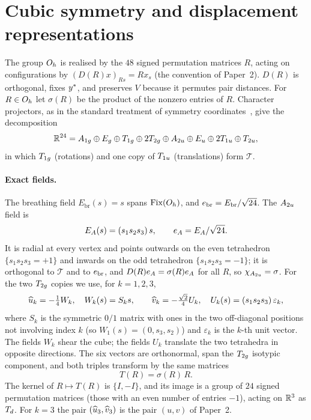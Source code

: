 \section{Cubic symmetry and displacement representations}\label{sec:symmetry}

The group $O_{h}$ is realised by the $48$ signed permutation matrices $R$, acting on configurations by
$(D(R)x)_{Rs}=Rx_s$ (the convention of Paper~2). $D(R)$ is orthogonal, fixes $y^{*}$, and preserves $V$ because it
permutes pair distances. For $R\in O_{h}$ let $\sigma(R)$ be the product of the nonzero entries of $R$. Character
projectors, as in the standard treatment of symmetry coordinates~\citep{WilsonDeciusCross1955}, give the decomposition
\begin{equation}\label{eq:gamma24}
\mathbb{R}^{24}=A_{1g}\oplus E_{g}\oplus T_{1g}\oplus2T_{2g}\oplus A_{2u}\oplus E_{u}\oplus2T_{1u}\oplus T_{2u},
\end{equation}
in which $T_{1g}$ (rotations) and one copy of $T_{1u}$ (translations) form $\mathcal T$.

\paragraph{Exact fields.} The breathing field $E_{\mathrm{br}}(s)=s$ spans $\operatorname{Fix}(O_{h})$, and $e_{\mathrm{br}}=E_{\mathrm{br}}/\sqrt{24}$. The
$A_{2u}$ field is
\begin{equation}\label{eq:eA}
E_A(s)=(s_1s_2s_3)\,s,\qquad e_{A}=E_A/\sqrt{24}.
\end{equation}
It is radial at every vertex and points outwards on the even tetrahedron $\{s_1s_2s_3=+1\}$ and inwards on the odd
tetrahedron $\{s_1s_2s_3=-1\}$; it is orthogonal to $\mathcal T$ and to $e_{\mathrm{br}}$, and $D(R)e_{A}=\sigma(R)e_{A}$ for all $R$, so
$\chi_{A_{2u}}=\sigma$. For the two $T_{2g}$ copies we use, for $k=1,2,3$,
\begin{equation}\label{eq:t2gbasis}
\widehat{u}_k=-\tfrac14W_k,\quad W_k(s)=S_k s,\qquad \widehat{v}_k=-\tfrac{\sqrt2}{4}U_k,\quad U_k(s)=(s_1s_2s_3)\,\varepsilon_k,
\end{equation}
where $S_k$ is the symmetric $0/1$ matrix with ones in the two off-diagonal positions not involving index $k$ (so
$W_1(s)=(0,s_3,s_2)$) and $\varepsilon_k$ is the $k$-th unit vector. The fields $W_k$ shear the cube; the fields $U_k$
translate the two tetrahedra in opposite directions. The six vectors are orthonormal, span the $T_{2g}$ isotypic
component, and both triples transform by the same matrices
\begin{equation}\label{eq:TR}
T(R)=\sigma(R)\,R .
\end{equation}
The kernel of $R\mapsto T(R)$ is $\{I,-I\}$, and its image is a group of $24$ signed permutation matrices (those with an
even number of entries $-1$), acting on $\mathbb{R}^3$ as $T_{d}$. For $k=3$ the pair $(\widehat{u}_3,\widehat{v}_3)$ is the pair $(u,v)$ of
Paper~2.

